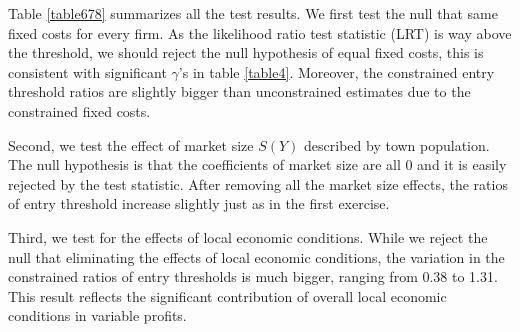 \documentclass[a4paper,11pt]{article}
\begin{document}
Table \ref{table678} summarizes all the test results. We first test the null that same fixed costs for every firm. As the likelihood ratio test statistic (LRT) is way above the threshold, we should reject the null hypothesis of equal fixed costs, this is consistent with significant $\gamma$'s in table \ref{table4}. Moreover, the constrained entry threshold ratios are slightly bigger than unconstrained estimates due to the constrained fixed costs.

Second, we test the effect of market size $S(Y)$ described by town population. The null hypothesis is that the coefficients of market size are all 0 and it is easily rejected by the test statistic. After removing all the market size effects, the ratios of entry threshold increase slightly just as in the first exercise.

Third, we test for the effects of local economic conditions. While we reject the null that eliminating the effects of local economic conditions, the variation in the constrained ratios of entry thresholds is much bigger, ranging from 0.38 to 1.31. This result reflects the significant contribution of overall local economic conditions in variable profits. 
\end{document}
